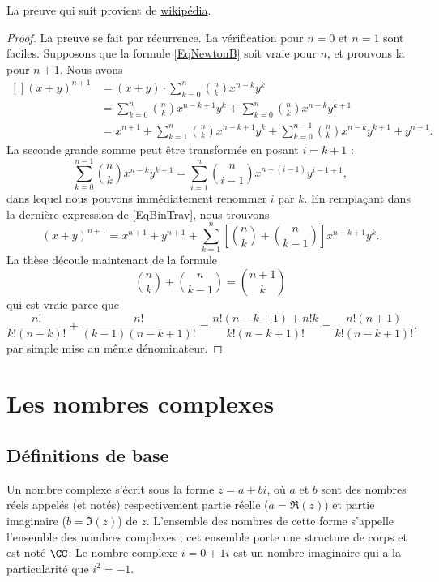 La preuve qui suit provient de \href{http://fr.wikipedia.org/wiki/Formule_du_binôme_de_Newton}{wikipédia}.
\begin{proof}
La preuve se fait par récurrence. La vérification pour $n=0$ et $n=1$ sont faciles. Supposons que la formule \eqref{EqNewtonB} soit vraie pour $n$, et prouvons la pour $n+1$. Nous avons
\begin{equation}        \label{EqBinTrav}
    \begin{aligned}[]
        (x+y)^{n+1} &=(x+y)\cdot  \sum_{k=0}^n{n\choose k}x^{n-k}y^k\\
                &= \sum_{k=0}^n{n\choose k}x^{n-k+1}y^k+\sum_{k=0}^n{n\choose k}x^{n-k}y^{k+1}\\
                &=x^{n+1}+ \sum_{k=1}^n{n\choose k}x^{n-k+1}y^k+\sum_{k=0}^{n-1}{n\choose k}x^{n-k}y^{k+1}+y^{n+1}.
    \end{aligned}
\end{equation}
La seconde grande somme peut être transformée en posant $i=k+1$ :
\begin{equation}
    \sum_{k=0}^{n-1}{n\choose k}x^{n-k}y^{k+1}  =\sum_{i=1}^n{n\choose i-1}x^{n-(i-1)}y^{i-1+1},
\end{equation}
dans lequel nous pouvons immédiatement renommer $i$ par $k$. En remplaçant dans la dernière expression de \eqref{EqBinTrav}, nous trouvons
\begin{equation}
    (x+y)^{n+1}=x^{n+1}+y^{n+1}+\sum_{k=1}^n\left[ {n\choose k}+{n\choose k-1} \right]x^{n-k+1}y^k.
\end{equation}
La thèse découle maintenant de la formule
\begin{equation}
    {n\choose k}+{n\choose k-1}={n+1\choose k}
\end{equation}
qui est vraie parce que
\begin{equation}
    \frac{ n! }{ k!(n-k)! }+\frac{ n! }{ (k-1)(n-k+1)! }=\frac{ n!(n-k+1)+n!k }{ k!(n-k+1)! }=\frac{ n!(n+1) }{  k!(n-k+1)!  },
\end{equation}
par simple mise au même dénominateur.
\end{proof}


 \section{Les nombres complexes}
 \subsection{Définitions de base}
 Un nombre complexe s'écrit sous la forme $z = a + b i$, où $a$ et $b$
 sont des nombres réels appelés (et notés) respectivement partie réelle
 ($a = \Re(z)$) et partie imaginaire ($b = \Im(z)$) de $z$. L'ensemble
 des nombres de cette forme s'appelle l'ensemble des nombres complexes
 ; cet ensemble porte une structure de corps et est noté $\CC$. Le
 nombre complexe $i = 0 + 1 i$ est un nombre imaginaire qui a la
 particularité que $i^2 = -1$.

